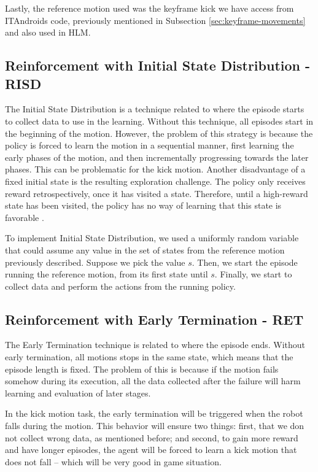 Lastly, the reference motion used was the keyframe kick we have access from ITAndroids code, previously mentioned in Subsection \ref{sec:keyframe-movements} and also used in HLM.


\subsection{Reinforcement with Initial State Distribution - RISD}\label{risd}

The Initial State Distribution is a technique related to where the episode starts to collect data to use in the learning. Without this technique, all episodes start in the beginning of the motion. However, the problem of this strategy is because the policy is forced to learn the motion in a sequential manner, first learning the early phases of the motion, and then incrementally progressing towards the later phases. This can be problematic for the kick motion. Another disadvantage of a fixed initial state is the resulting exploration challenge. The policy only receives reward retrospectively, once it has visited a state. Therefore, until a high-reward state has been visited, the policy has no way of learning that this state is favorable \cite{peng2018}.

To implement Initial State Distribution, we used a uniformly random variable that could assume any value in the set of states from the reference motion previously described. Suppose we pick the value $s$. Then, we start the episode running the reference motion, from its first state until $s$. Finally, we start to collect data and perform the actions from the running policy.

\subsection{Reinforcement with Early Termination - RET}

The Early Termination technique is related to where the episode ends. Without early termination, all motions stops in the same state, which means that the episode length is fixed. The problem of this is because if the motion fails somehow during its execution, all the data collected after the failure will harm learning and evaluation of later stages.

In the kick motion task, the early termination will be triggered when the robot falls during the motion. This behavior will ensure two things: first, that we don not collect wrong data, as mentioned before; and second, to gain more reward and have longer episodes, the agent will be forced to learn a kick motion that does not fall -- which will be very good in game situation.

